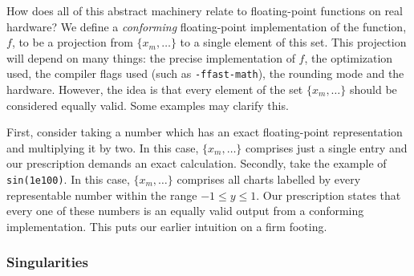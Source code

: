 \documentclass[prd,twocolumn,amsmath,amssymb,nofootinbib,eqsecnum]{revtex4-1}
\newcommand{\code}[1]{{\tt #1}}
\begin{document}
How does all of this abstract machinery relate to floating-point functions on real hardware? We define a \emph{conforming} floating-point implementation of the function, $f$, to be a projection from $\{x_{m}, \ldots\}$ to a single element of this set. This projection will depend on many things: the precise implementation of $f$, the optimization used, the compiler flags used (such as \code{-ffast-math}), the rounding mode and the hardware. However, the idea is that every element of the set $\{x_{m}, \ldots\}$ should be considered equally valid. Some examples may clarify this.

First, consider taking a number which has an exact floating-point representation and multiplying it by two.
In this case, $\{x_{m}, \ldots\}$ comprises just a single entry and our prescription demands an exact calculation. Secondly, take the example of \code{sin(1e100)}. In this case, $\{x_{m}, \ldots\}$ comprises all charts labelled by every representable number within the range $-1 \leq y \leq 1$. Our prescription states that every one of these numbers is an equally valid output from a conforming implementation. This puts our earlier intuition on a firm footing.

\subsubsection{Singularities}
\end{document}
